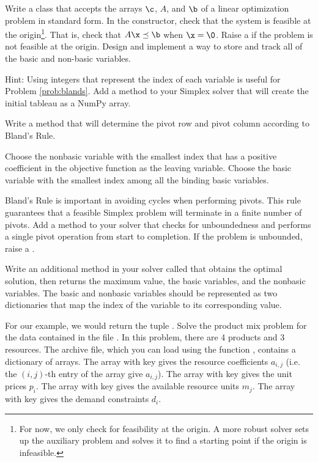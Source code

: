 Write a class that accepts the arrays $\c$, $A$, and $\b$ of a linear optimization problem in standard form.
In the constructor, check that the system is feasible at the origin\footnote{For now, we only check for feasibility at the origin.
A more robust solver sets up the auxiliary problem and solves it to find a starting point if the origin is infeasible.}.
That is, check that $A\x \preceq \b$ when $\x = \0$.
Raise a  if the problem is not feasible at the origin.
\label{prob:initsolver}
Design and implement a way to store and track all of the basic and non-basic variables.

Hint: Using integers that represent the index of each variable is useful for Problem \ref{prob:blands}.
\label{prob:slackvars}
Add a method to your Simplex solver that will create the initial tableau as a NumPy array.
\label{prob:maketableau}

Write a method that will determine the pivot row and pivot column according to Bland's Rule.
\begin{definition}
Choose the nonbasic variable with the smallest index that has a positive coefficient in the objective function
as the leaving variable.
Choose the basic variable with the smallest index among all the binding basic variables.
\end{definition}

Bland's Rule is important in avoiding cycles when performing pivots.
This rule guarantees that a feasible Simplex problem will terminate in a finite number of pivots.
\label{prob:blands}
Add a method to your solver that checks for unboundedness and performs a single pivot operation from start to completion.
If the problem is unbounded, raise a .

Write an additional method in your solver called  that obtains the optimal solution, then returns the maximum value, the basic variables, and the nonbasic variables.
The basic and nonbasic variables should be represented as two dictionaries that map the index of the variable to its corresponding value.

For our example, we would return the tuple .
Solve the product mix problem for the data contained in the file .
In this problem, there are 4 products and 3 resources.
The archive file, which you can load using the function
, contains a dictionary of arrays.
The array with key  gives the resource coefficients $a_{i,j}$ (i.e. the $(i,j)$-th entry of the array give $a_{i,j}$).
The array with key  gives the unit prices $p_i$.
The array with key  gives the available resource
units $m_j$.
The array with key  gives the demand constraints $d_i$.

